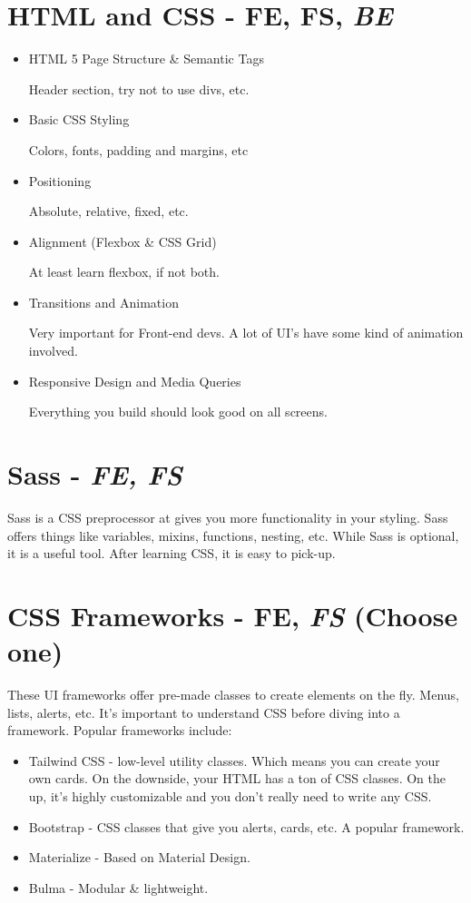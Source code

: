 \section{HTML and CSS - FE, FS, \emph{BE}}
\begin{itemize}
    \item HTML 5 Page Structure \& Semantic Tags
    
    Header section, try not to use divs, etc.
    \item Basic CSS Styling
    
    Colors, fonts, padding and margins, etc
    \item Positioning
    
    Absolute, relative, fixed, etc.
    \item Alignment (Flexbox \& CSS Grid)

    At least learn flexbox, if not both.
    \item Transitions and Animation
    
    Very important for Front-end devs. A lot of UI's have some kind of animation involved.
    \item Responsive Design and Media Queries
    
    Everything you build should look good on all screens. 
\end{itemize}
\section{Sass - \emph{FE, FS}}
Sass is a CSS preprocessor at gives you more functionality in your styling. Sass offers things like variables, mixins, functions, nesting, etc. While Sass is optional, it is a useful tool. After learning CSS, it is easy to pick-up.

\section{CSS Frameworks - FE, \emph{FS} \small{(Choose one)}}

These UI frameworks offer pre-made classes to create elements on the fly. Menus, lists, alerts, etc. 
It's important to understand CSS before diving into a framework. 
Popular frameworks include: 
\begin{itemize}
    \item Tailwind CSS - low-level utility classes. Which means you can create your own cards. On the downside, your HTML has a ton of CSS classes. On the up, it's highly customizable and you don't really need to write any CSS.
    \item Bootstrap - CSS classes that give you alerts, cards, etc. A popular framework.
    \item Materialize - Based on Material Design.
    \item Bulma - Modular \& lightweight.
\end{itemize}


